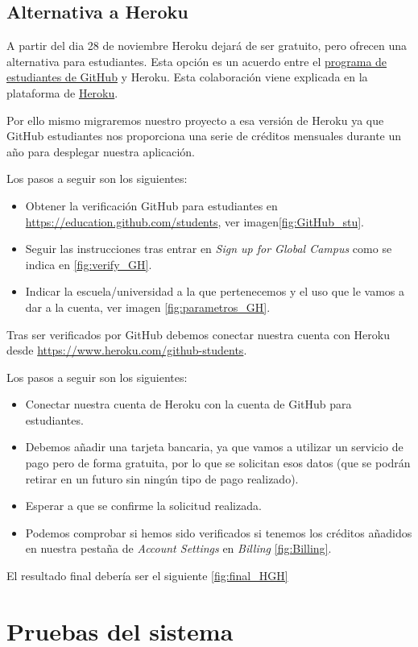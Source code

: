  
\subsection{Alternativa a Heroku}

A partir del dia 28 de noviembre Heroku dejará de ser gratuito, pero ofrecen una alternativa para estudiantes. Esta opción es un acuerdo entre el \href{https://education.github.com}{programa de estudiantes de GitHub} y Heroku. 
Esta colaboración viene explicada en la plataforma de \href{https://blog.heroku.com/github-student-developer-program}{Heroku}.

Por ello mismo migraremos nuestro proyecto a esa versión de Heroku ya que GitHub estudiantes nos proporciona una serie de créditos mensuales durante un año para desplegar nuestra aplicación.

Los pasos a seguir son los siguientes:
\begin{itemize}
	\item Obtener la verificación GitHub para estudiantes en
	 \href{https://education.github.com/students}{https://education.github.com/students}, ver imagen\ref{fig:GitHub_stu}.
	\item Seguir las instrucciones tras entrar en \emph{Sign up for Global Campus} como se indica en \ref{fig:verify_GH}.
	\item Indicar la escuela/universidad a la que pertenecemos y el uso que le vamos a dar a la cuenta, ver imagen \ref{fig:parametros_GH}.
\end{itemize}




Tras ser verificados por GitHub debemos conectar nuestra cuenta con Heroku desde \href{https://www.heroku.com/github-students}{https://www.heroku.com/github-students}.

Los pasos a seguir son los siguientes:
\begin{itemize}
	\item Conectar nuestra cuenta de Heroku con la cuenta de GitHub para estudiantes.
	\item Debemos añadir una tarjeta bancaria, ya que vamos a utilizar un servicio de pago pero de forma gratuita, por lo que se solicitan esos datos (que se podrán retirar en un futuro sin ningún tipo de pago realizado).
	\item Esperar a que se confirme la solicitud realizada.
	\item Podemos comprobar si hemos sido verificados si tenemos los créditos añadidos en nuestra pestaña de \emph{Account Settings} en \emph{Billing} \ref{fig:Billing}.
\end{itemize}
El resultado final debería ser el siguiente \ref{fig:final_HGH}



\section{Pruebas del sistema}
